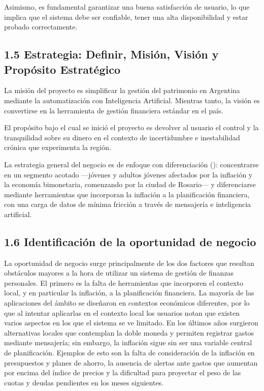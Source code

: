 Asimismo, es fundamental garantizar una buena satisfacción de usuario,
lo que implica que el sistema debe ser confiable, tener una alta
disponibilidad y estar probado correctamente.

\subsection*{1.5 Estrategia: Definir, Misión, Visión y Propósito
Estratégico}\label{estrategia-definir-misiuxf3n-visiuxf3n-y-propuxf3sito-estratuxe9gico}

La misión del proyecto es simplificar la gestión del patrimonio en
Argentina mediante la automatización con Inteligencia Artificial.
Mientras tanto, la visión es convertirse en la herramienta de gestión
financiera estándar en el país.

El propósito bajo el cual se inició el proyecto es devolver al usuario
el control y la tranquilidad sobre su dinero en el contexto de
incertidumbre e inestabilidad crónica que experimenta la región.

La estrategia general del negocio es de enfoque con diferenciación
(): concentrarse en un segmento
acotado ---jóvenes y adultos jóvenes afectados por la inflación y la
economía bimonetaria, comenzando por la ciudad de Rosario--- y
diferenciarse mediante herramientas que incorporan la inflación a la
planificación financiera, con una carga de datos de mínima fricción a
través de mensajería e inteligencia artificial.

\subsection*{1.6 Identificación de la oportunidad de
negocio}\label{identificaciuxf3n-de-la-oportunidad-de-negocio}

La oportunidad de negocio surge principalmente de los dos factores que
resultan obstáculos mayores a la hora de utilizar un sistema de gestión
de finanzas personales. El primero es la falta de herramientas que
incorporen el contexto local, y en particular la inflación, a la
planificación financiera. La mayoría de las aplicaciones del ámbito se
diseñaron en contextos económicos diferentes, por lo que al intentar
aplicarlas en el contexto local los usuarios notan que existen varios
aspectos en los que el sistema se ve limitado. En los últimos años
surgieron alternativas locales que contemplan la doble moneda y permiten
registrar gastos mediante mensajería; sin embargo, la inflación sigue
sin ser una variable central de planificación. Ejemplos de esto son la
falta de consideración de la inflación en presupuestos y planes de
ahorro, la ausencia de alertas ante gastos que aumentan por encima del
índice de precios y la dificultad para proyectar el peso de las cuotas y
deudas pendientes en los meses siguientes.

